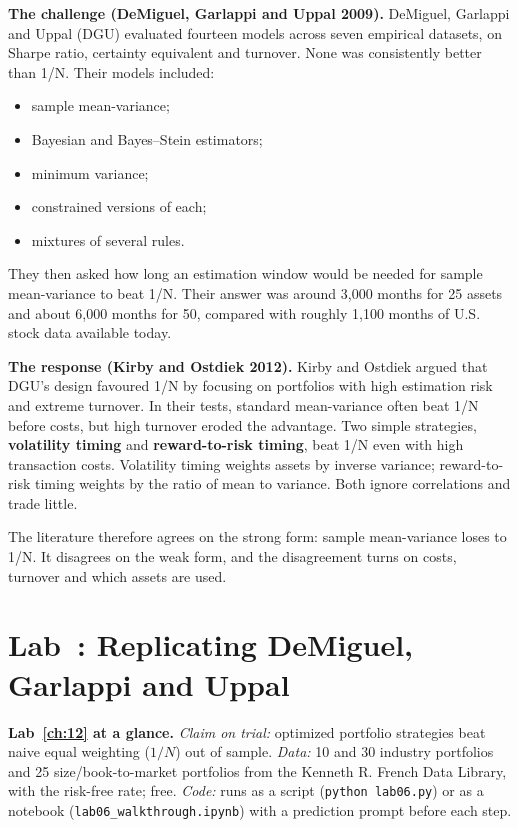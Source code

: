 \textbf{The challenge (DeMiguel, Garlappi and Uppal 2009).} DeMiguel, Garlappi and Uppal (DGU) evaluated fourteen models across seven empirical datasets, on Sharpe ratio, certainty equivalent and turnover. None was consistently better than 1/N. Their models included:

\begin{itemize}
  \item sample mean-variance;
  \item Bayesian and Bayes--Stein estimators;
  \item minimum variance;
  \item constrained versions of each;
  \item mixtures of several rules.
\end{itemize}

They then asked how long an estimation window would be needed for sample mean-variance to beat 1/N. Their answer was around 3,000 months for 25 assets and about 6,000 months for 50, compared with roughly 1,100 months of U.S. stock data available today.

\textbf{The response (Kirby and Ostdiek 2012).} Kirby and Ostdiek argued that DGU's design favoured 1/N by focusing on portfolios with high estimation risk and extreme turnover. In their tests, standard mean-variance often beat 1/N before costs, but high turnover eroded the advantage. Two simple strategies, \textbf{volatility timing} and \textbf{reward-to-risk timing}, beat 1/N even with high transaction costs. Volatility timing weights assets by inverse variance; reward-to-risk timing weights by the ratio of mean to variance. Both ignore correlations and trade little.

The literature therefore agrees on the strong form: sample mean-variance loses to 1/N. It disagrees on the weak form, and the disagreement turns on costs, turnover and which assets are used.

\section{Lab~\thechapter: Replicating DeMiguel, Garlappi and Uppal}
\label{sec:12-lab}

\begin{callout}
\textbf{Lab~\ref{ch:12} at a glance.} \emph{Claim on trial:} optimized portfolio strategies beat naive equal weighting ($1/N$) out of sample. \emph{Data:} 10 and 30 industry portfolios and 25 size/book-to-market portfolios from the Kenneth R. French Data Library, with the risk-free rate; free. \emph{Code:} runs as a script (\texttt{python lab06.py}) or as a notebook (\texttt{lab06\_walkthrough.ipynb}) with a prediction prompt before each step.
\end{callout}


